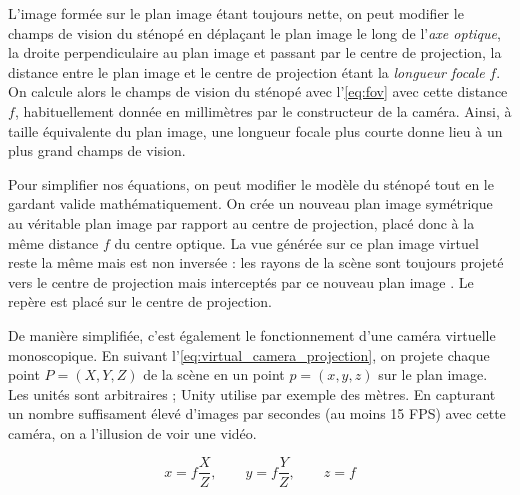 
L'image formée sur le plan image étant toujours nette, on peut modifier le champs de vision du sténopé en déplaçant le plan image le long de l'\emph{axe optique}, la droite perpendiculaire au plan image et passant par le centre de projection, la distance entre le plan image et le centre de projection étant la \emph{longueur focale} $f$. On calcule alors le champs de vision du sténopé avec l'\autoref{eq:fov} avec cette distance $f$, habituellement donnée en millimètres par le constructeur de la caméra. Ainsi, à taille équivalente du plan image, une longueur focale plus courte donne lieu à un plus grand champs de vision.

Pour simplifier nos équations, on peut modifier le modèle du sténopé tout en le gardant valide mathématiquement. On crée un nouveau plan image symétrique au véritable plan image par rapport au centre de projection, placé donc à la même distance $f$ du centre optique. La vue générée sur ce plan image virtuel reste la même mais est non inversée : les rayons de la scène sont toujours projeté vers le centre de projection mais interceptés par ce nouveau plan image . Le repère est placé sur le centre de projection.


De manière simplifiée, c'est également le fonctionnement d'une caméra virtuelle monoscopique. En suivant l'\autoref{eq:virtual_camera_projection}, on projete chaque point $P=(X,Y,Z)$ de la scène en un point $p=(x,y,z)$ sur le plan image. Les unités sont arbitraires ; Unity utilise par exemple des mètres. En capturant un nombre suffisament élevé d'images par secondes (au moins 15 FPS) avec cette caméra, on a l'illusion de voir une vidéo.

\begin{equation}
  \label{eq:virtual_camera_projection}
  x = f \frac{X}{Z},\qquad y = f \frac{Y}{Z},\qquad z = f
\end{equation}

